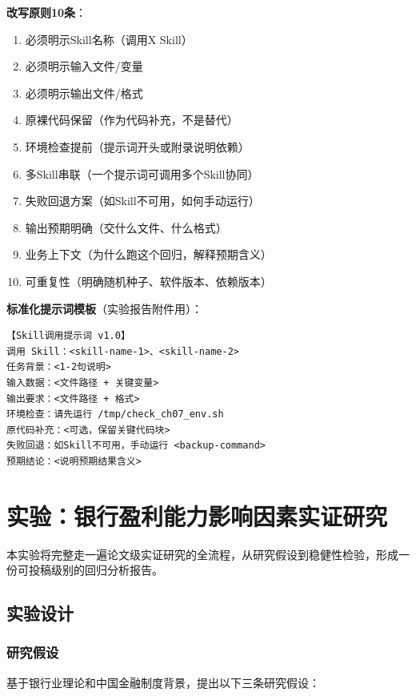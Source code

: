 \textbf{改写原则10条}：
\begin{enumerate}[leftmargin=2em]
  \item 必须明示Skill名称（调用X Skill）
  \item 必须明示输入文件/变量
  \item 必须明示输出文件/格式
  \item 原裸代码保留（作为代码补充，不是替代）
  \item 环境检查提前（提示词开头或附录说明依赖）
  \item 多Skill串联（一个提示词可调用多个Skill协同）
  \item 失败回退方案（如Skill不可用，如何手动运行）
  \item 输出预期明确（交什么文件、什么格式）
  \item 业务上下文（为什么跑这个回归，解释预期含义）
  \item 可重复性（明确随机种子、软件版本、依赖版本）
\end{enumerate}

\textbf{标准化提示词模板}（实验报告附件用）：
\begin{lstlisting}
【Skill调用提示词 v1.0】
调用 Skill：<skill-name-1>、<skill-name-2>
任务背景：<1-2句说明>
输入数据：<文件路径 + 关键变量>
输出要求：<文件路径 + 格式>
环境检查：请先运行 /tmp/check_ch07_env.sh
原代码补充：<可选，保留关键代码块>
失败回退：如Skill不可用，手动运行 <backup-command>
预期结论：<说明预期结果含义>
\end{lstlisting}

\section{实验：银行盈利能力影响因素实证研究}

本实验将完整走一遍论文级实证研究的全流程，从研究假设到稳健性检验，形成一份可投稿级别的回归分析报告。

\subsection{实验设计}

\subsubsection{研究假设}

基于银行业理论和中国金融制度背景，提出以下三条研究假设：

